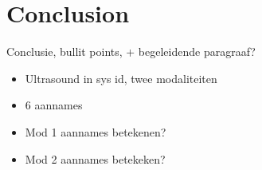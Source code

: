 \chapter{Conclusion}


Conclusie, bullit points, + begeleidende paragraaf? 
\begin{itemize}
	\item Ultrasound in sys id, twee modaliteiten
	\item 6 aannames
	\item Mod 1 aannames betekenen?
	\item Mod 2 aannames betekeken? 
\end{itemize}